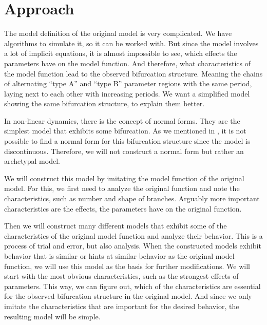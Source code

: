 \chapter{Approach}
\label{chap:approach}

The model definition of the original model is very complicated.
We have algorithms to simulate it, so it can be worked with.
But since the model involves a lot of implicit equations, it is almost impossible to see, which effects the parameters have on the model function.
And therefore, what characteristics of the model function lead to the observed bifurcation structure.
Meaning the chains of alternating ``type A'' and ``type B'' parameter regions with the same period, laying next to each other with increasing periods.
We want a simplified model showing the same bifurcation structure, to explain them better.

In non-linear dynamics, there is the concept of normal forms.
They are the simplest model that exhibits some bifurcation.
As we mentioned in , it is not possible to find a normal form for this bifurcation structure since the model is discontinuous.
Therefore, we will not construct a normal form but rather an archetypal model.

We will construct this model by imitating the model function of the original model.
For this, we first need to analyze the original function and note the characteristics, such as number and shape of branches.
Arguably more important characteristics are the effects, the parameters have on the original function.

Then we will construct many different models that exhibit some of the characteristics of the original model function and analyze their behavior.
This is a process of trial and error, but also analysis.
When the constructed models exhibit behavior that is similar or hints at similar behavior as the original model function, we will use this model as the basis for further modifications.
We will start with the most obvious characteristics, such as the strongest effects of parameters.
This way, we can figure out, which of the characteristics are essential for the observed bifurcation structure in the original model.
And since we only imitate the characteristics that are important for the desired behavior, the resulting model will be simple.
